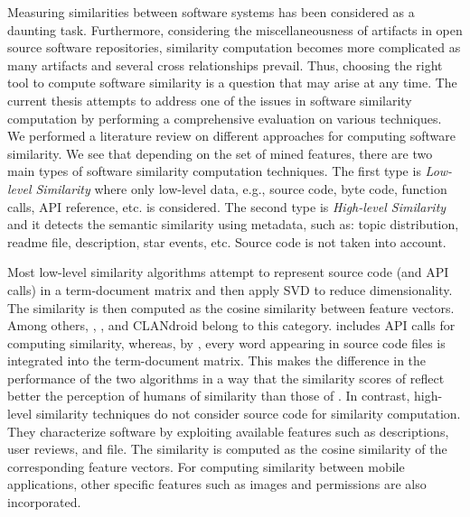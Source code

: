 
Measuring similarities between software systems has been considered as a daunting task. Furthermore, considering the miscellaneousness of artifacts in open source software repositories, similarity computation becomes more complicated as many artifacts and several cross relationships prevail. Thus, choosing the right tool to compute software similarity is a question that may arise at any time. The current thesis attempts to address one of the issues in software similarity computation by performing a comprehensive evaluation on various techniques. We performed a literature review on different approaches for computing software similarity. We see that depending on the set of mined features, there are two main types of software similarity computation techniques. The first type is \textit{Low-level Similarity} where only low-level data, e.g., source code, byte code, function calls, API reference, etc. is considered. The second type is \textit{High-level Similarity} and it detects the semantic similarity using metadata, such as: topic distribution, readme file, description, star events, etc. Source code is not taken into account.

Most low-level similarity algorithms attempt to represent source code (and API calls) in a term-document matrix and then apply SVD to reduce dimensionality. The similarity is then computed as the cosine similarity between feature vectors. Among others, \MUDABlue \cite{10.1109/APSEC.2004.69}, \CLAN \cite{McMillan:2012:DSS:2337223.2337267}, and CLANdroid \cite{10.1109ICPC.2016.7503721} belong to this category. \CLAN includes API calls for computing similarity, whereas, by \MUDABlue, every word appearing in source code files is integrated into the term-document matrix. This makes the difference in the performance of the two algorithms in a way that the similarity scores of \CLAN reflect better the perception of humans of similarity than those of \MUDABlue. In contrast, high-level similarity techniques do not consider source code for similarity computation. They characterize software by exploiting available features such as descriptions, user reviews, and  file. The similarity is computed as the cosine similarity of the corresponding feature vectors. For computing similarity between mobile applications, other specific features such as images and permissions are also incorporated. 

